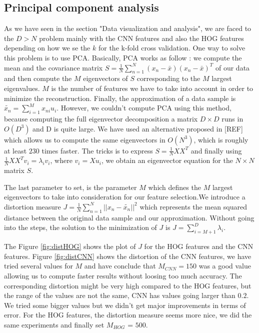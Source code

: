 \documentclass{article} %
\begin{document}
\subsection{Principal component analysis}

As we have seen in the section "Data visualization and analysis", we are faced to the $D > N$ problem mainly with the CNN features and also the HOG features depending on how we se the $k$ for the k-fold cross validation. One way to solve this problem is to use PCA.  Basically, PCA works as follow : we compute the mean and the covariance matrix $S = \frac{1}{N}\sum_{n=1}^{N}(x_n-\bar{x})(x_n-\bar{x})^T$ of our data and then compute the $M$ eigenvectors of $S$ corresponding to the $M$ largest eigenvalues. $M$ is the number of features we have to take into account in order to minimize the reconstruction. Finally, the approximation of a data sample is $\tilde{x_n} = \sum_{i=1}^M x_{ni} u_i$. However, we couldn't compute PCA using this method, because computing the full eigenvector decomposition a matrix $D \times D$ runs in  $O(D^3)$ and D is quite large. 
We have used an alternative proposed in [REF] which allows us to compute the same eigenvectors in $O(N^3)$, which is roughly at least $230$ times faster. The tricks is to express $S = \frac{1}{N}XX^T$ and finally using $\frac{1}{N}XX^Tv_i = \lambda_i v_i$, where $v_i=Xu_i$, we obtain an eigenvector equation for the $N \times N$ matrix $S$.

The last parameter to set, is the parameter $M$ which defines the $M$ largest eigenvectors to take into consideration for our feature selection.We introduce a distortion measure $J = \frac{1}{N}\sum_{n=1}^{N}||x_n-\tilde{x_n}||^2$ which represents the mean squared distance between the original data sample and our approximation. Without going into the steps, the solution to the minimization of $J$ is $J = \sum_{i=M+1}^D \lambda_i$. 


The Figure \ref{fig:distHOG} shows the plot of $J$ for the HOG features and the CNN features. Figure \ref{fig:distCNN} shows the distortion of the CNN features, we have tried several values for $M$ and have conclude that $M_{CNN} = 150$ was a good value allowing us to compute faster results without loosing too much accuracy. The corresponding distortion might be very high compared to the HOG features, but the range of the values are not the same, CNN has values going larger than $0.2$. We tried some bigger values but we didn't get major improvements in terms of error. For the HOG features, the distortion measure seems more nice, we did the same experiments and finally set $M_{HOG}$ = $500$. 
\end{document}
